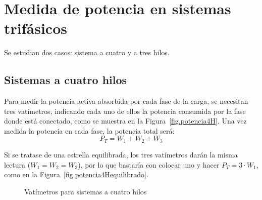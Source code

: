 	\section{Medida de potencia en sistemas trifásicos} 
	
	Se estudian dos casos: sistema a cuatro y a tres hilos.
	
	\subsection{Sistemas a cuatro hilos}
	Para medir la potencia activa absorbida por cada fase de la carga, se necesitan tres vatímetros, indicando cada uno de ellos la potencia consumida por la fase donde está conectado, como se muestra en la Figura~\ref{fig.potencia4H}. Una vez medida la potencia en cada fase, la potencia total será:
	\begin{equation}
		\boxed{P_T=W_1+W_2+W_3}
	\end{equation}
	
	\begin{remark}
	    Si se tratase de una estrella equilibrada, los tres vatímetros darán la misma lectura ($W_1=W_2=W_3$), por lo que bastaría con colocar uno y hacer $P_T=3\cdot W_1$, como en la Figura~\ref{fig.potencia4Hequilibrado}.
	\end{remark}
	\begin{figure}[H]
		\centering
		\hfill
		\caption{Vatímetros para sistemas a cuatro hilos}
		\label{fig.vatimetro4hilos}
	\end{figure}
	
